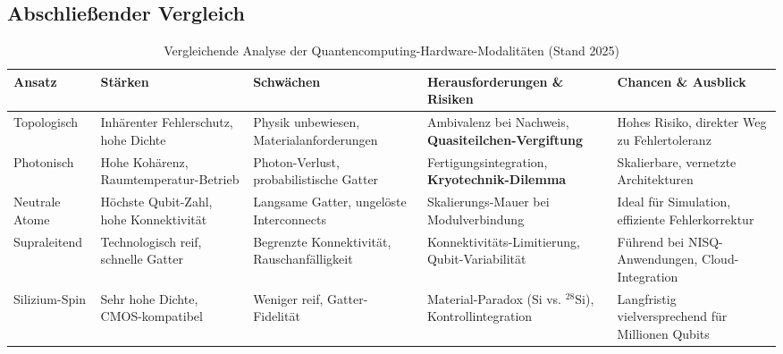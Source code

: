 \subsection{Abschließender Vergleich}
\begin{table}[ht]
\centering
\caption{Vergleichende Analyse der Quantencomputing-Hardware-Modalitäten (Stand 2025)}
\label{tab:quantum_comparison_simple}
\begin{tabular}{lllll}
\toprule
\textbf{Ansatz} & \textbf{Stärken} & \textbf{Schwächen} & \textbf{Herausforderungen \& Risiken} & \textbf{Chancen \& Ausblick} \\
\midrule

Topologisch & Inhärenter Fehlerschutz, hohe Dichte & Physik unbewiesen, Materialanforderungen & Ambivalenz bei Nachweis, \textbf{Quasiteilchen-Vergiftung} & Hohes Risiko, direkter Weg zu Fehlertoleranz \\
\addlinespace %

Photonisch & Hohe Kohärenz, Raumtemperatur-Betrieb & Photon-Verlust, probabilistische Gatter & Fertigungsintegration, \textbf{Kryotechnik-Dilemma} & Skalierbare, vernetzte Architekturen \\
\addlinespace

Neutrale Atome & Höchste Qubit-Zahl, hohe Konnektivität & Langsame Gatter, ungelöste Interconnects & Skalierungs-Mauer bei Modulverbindung & Ideal für Simulation, effiziente Fehlerkorrektur \\
\addlinespace

Supraleitend & Technologisch reif, schnelle Gatter & Begrenzte Konnektivität, Rauschanfälligkeit & Konnektivitäts-Limitierung, Qubit-Variabilität & Führend bei NISQ-Anwendungen, Cloud-Integration \\
\addlinespace

Silizium-Spin & Sehr hohe Dichte, CMOS-kompatibel & Weniger reif, Gatter-Fidelität & Material-Paradox (Si vs. $^{28}$Si), Kontrollintegration & Langfristig vielversprechend für Millionen Qubits \\

\bottomrule
\end{tabular}
\end{table}